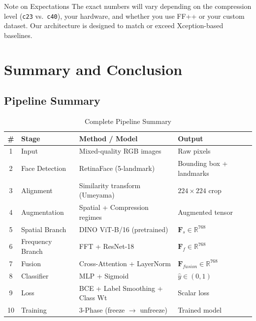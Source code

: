 \documentclass[12pt,a4paper]{article}
\begin{document}
\begin{warningbox}{Note on Expectations}
The exact numbers will vary depending on the compression level (\texttt{c23} vs.\
\texttt{c40}), your hardware, and whether you use FF++ or your custom dataset. Our
architecture is designed to match or exceed Xception-based baselines.
\end{warningbox}

\newpage

\section{Summary and Conclusion}

\subsection{Pipeline Summary}

\begin{table}[h]
\centering
\caption{Complete Pipeline Summary}
\begin{tabularx}{\textwidth}{clXl}
\toprule
\textbf{\#} & \textbf{Stage} & \textbf{Method / Model} & \textbf{Output} \\
\midrule
1 & Input            & Mixed-quality RGB images            & Raw pixels \\
2 & Face Detection   & RetinaFace (5-landmark)             & Bounding box + landmarks \\
3 & Alignment        & Similarity transform (Umeyama)      & $224\times224$ crop \\
4 & Augmentation     & Spatial + Compression regimes       & Augmented tensor \\
5 & Spatial Branch   & DINO ViT-B/16 (pretrained)          & $\mathbf{F}_s \in \mathbb{R}^{768}$ \\
6 & Frequency Branch & FFT + ResNet-18                     & $\mathbf{F}_f \in \mathbb{R}^{768}$ \\
7 & Fusion           & Cross-Attention + LayerNorm         & $\mathbf{F}_{fusion} \in \mathbb{R}^{768}$ \\
8 & Classifier       & MLP + Sigmoid                       & $\hat{y} \in (0,1)$ \\
9 & Loss             & BCE + Label Smoothing + Class Wt    & Scalar loss \\
10& Training         & 3-Phase (freeze $\to$ unfreeze)     & Trained model \\
\bottomrule
\end{tabularx}
\end{table}
\end{document}
